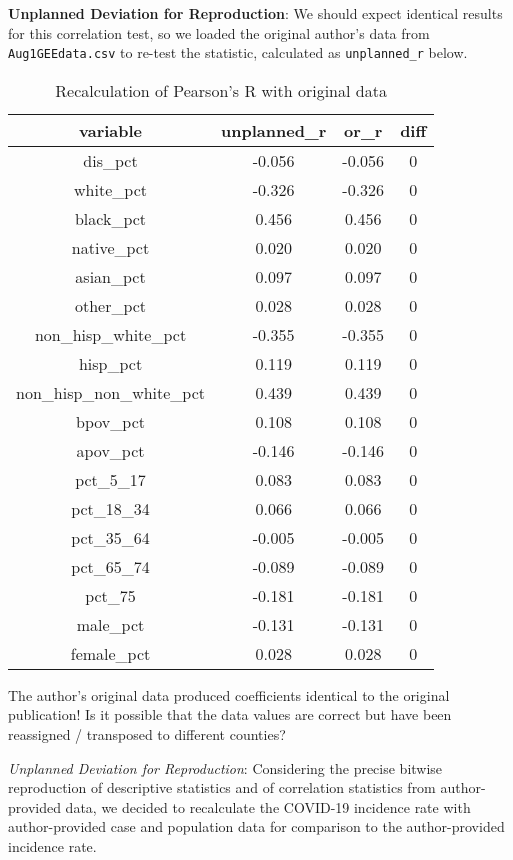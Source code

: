\documentclass[
]{article}
\begin{document}
\textbf{Unplanned Deviation for Reproduction}: We should expect
identical results for this correlation test, so we loaded the original
author's data from \texttt{Aug1GEEdata.csv} to re-test the statistic,
calculated as \texttt{unplanned\_r} below.

\begin{table}

\caption{\label{tab:original-data-pearson-correlation}Recalculation of Pearson's R with original data}
\centering
\begin{tabular}[t]{c|c|c|c}
\hline
variable & unplanned\_r & or\_r & diff\\
\hline
dis\_pct & -0.056 & -0.056 & 0\\
\hline
white\_pct & -0.326 & -0.326 & 0\\
\hline
black\_pct & 0.456 & 0.456 & 0\\
\hline
native\_pct & 0.020 & 0.020 & 0\\
\hline
asian\_pct & 0.097 & 0.097 & 0\\
\hline
other\_pct & 0.028 & 0.028 & 0\\
\hline
non\_hisp\_white\_pct & -0.355 & -0.355 & 0\\
\hline
hisp\_pct & 0.119 & 0.119 & 0\\
\hline
non\_hisp\_non\_white\_pct & 0.439 & 0.439 & 0\\
\hline
bpov\_pct & 0.108 & 0.108 & 0\\
\hline
apov\_pct & -0.146 & -0.146 & 0\\
\hline
pct\_5\_17 & 0.083 & 0.083 & 0\\
\hline
pct\_18\_34 & 0.066 & 0.066 & 0\\
\hline
pct\_35\_64 & -0.005 & -0.005 & 0\\
\hline
pct\_65\_74 & -0.089 & -0.089 & 0\\
\hline
pct\_75 & -0.181 & -0.181 & 0\\
\hline
male\_pct & -0.131 & -0.131 & 0\\
\hline
female\_pct & 0.028 & 0.028 & 0\\
\hline
\end{tabular}
\end{table}

The author's original data produced coefficients identical to the
original publication! Is it possible that the data values are correct
but have been reassigned / transposed to different counties?

\emph{Unplanned Deviation for Reproduction}: Considering the precise
bitwise reproduction of descriptive statistics and of correlation
statistics from author-provided data, we decided to recalculate the
COVID-19 incidence rate with author-provided case and population data
for comparison to the author-provided incidence rate.
\end{document}
